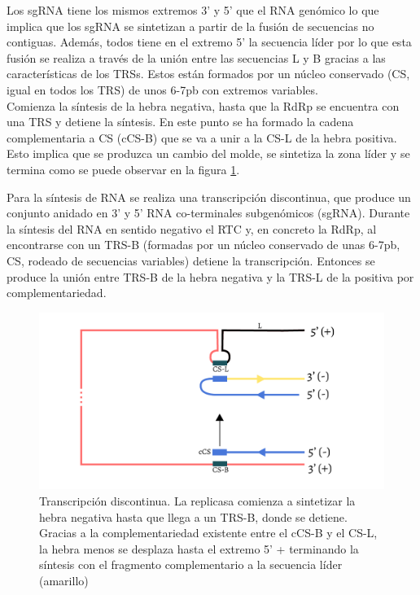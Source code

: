 \documentclass[a4paper,11pt]{report}
\begin{document}
 Los sgRNA tiene los mismos extremos 3' y 5' que el RNA genómico lo que implica que los sgRNA se sintetizan a partir de la fusión de secuencias no contiguas. Además, todos tiene en el extremo 5' la secuencia líder por lo que esta fusión se realiza a través de  la unión entre las secuencias L y B gracias a las características de los TRSs. Estos están formados por un núcleo conservado (CS, igual en todos los TRS) de unos 6-7pb con extremos variables.\\
 
 Comienza la síntesis de la hebra negativa, hasta que la RdRp se encuentra con una TRS y detiene la síntesis. En este punto se ha formado la cadena complementaria a CS (cCS-B) que se va a unir a la CS-L de la hebra positiva. Esto implica que se produzca un cambio del molde, se sintetiza la zona líder y se termina  como se puede observar en la figura \ref{repli}.
   
 Para la síntesis de RNA se realiza una transcripción discontinua, que produce un conjunto anidado en 3' y 5' RNA co-terminales subgenómicos (sgRNA). Durante la síntesis del RNA en sentido negativo el RTC y, en concreto la RdRp, al encontrarse con un TRS-B (formadas por un núcleo conservado de unas 6-7pb, CS, rodeado de secuencias variables) detiene la transcripción. Entonces se produce la unión entre TRS-B de la hebra negativa y la TRS-L de la positiva por complementariedad. \cite{nested}
 
  \begin{figure}[h]
 	\centering
 	\includegraphics[width=\textwidth]{Figuras/Figura2}
 	\caption{Transcripción discontinua. La replicasa comienza a sintetizar la hebra negativa hasta que llega a un TRS-B, donde se detiene. Gracias a la complementariedad existente entre el cCS-B y el CS-L, la hebra menos se desplaza hasta el extremo 5' + terminando la síntesis con el fragmento complementario a la secuencia líder (amarillo)}
 	\label{repli}	
 \end{figure}
 
\end{document}
